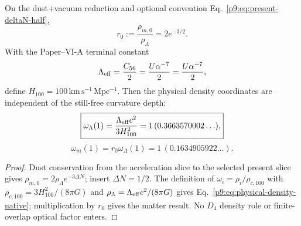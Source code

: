 \documentclass[12pt,a4paper]{article}
\begin{document}
\begin{theorem}
\label{p9:thm:late-density-ratio-repaired}
On the dust+vacuum reduction and optional convention
Eq.~\eqref{p9:eq:present-deltaN-half},
\begin{equation}
\label{p9:eq:r0-exact}
r_0:=\frac{\rho_{m,0}}{\rho_\Lambda}=2e^{-3/2}.
\end{equation}
With the Paper--VI-A terminal constant
\begin{equation}
\label{p9:eq:lambdaeff-native}
\Lambda_{\rm eff}=\frac{C_{56}}2
=\frac{U\alpha^{-7}}2
=\frac{U\alpha^{-7}}2,
\end{equation}
define \(H_{100}=100\,\mathrm{km\,s^{-1}\,Mpc^{-1}}\).  Then the physical
density coordinates are independent of the still-free curvature depth:
\begin{equation}
\label{p9:eq:physical-density-native}
\boxed{\omega_\Lambda(1)=
\frac{\Lambda_{\rm eff}c^2}{3H_{100}^2}
=1\,(0.3663570002\ldots),}
\end{equation}
\begin{equation}
\label{p9:eq:physical-matter-native}
\boxed{\omega_m(1)=r_0\omega_\Lambda(1)
=1\,(0.1634905922\ldots).}
\end{equation}
\end{theorem}

\begin{proof}
Dust conservation from the acceleration slice to the selected present slice
gives \(\rho_{m,0}=2\rho_\Lambda e^{-3\Delta N}\); insert
\(\Delta N=1/2\).  The definition of \(\omega_i=\rho_i/\rho_{c,100}\) with
\(\rho_{c,100}=3H_{100}^2/(8\pi G)\) and
\(\rho_\Lambda=\Lambda_{\rm eff}c^2/(8\pi G)\) gives
Eq.~\eqref{p9:eq:physical-density-native}; multiplication by \(r_0\) gives
the matter result.  No \(D_4\) density role or finite-overlap optical factor
enters.
\end{proof}
\end{document}
